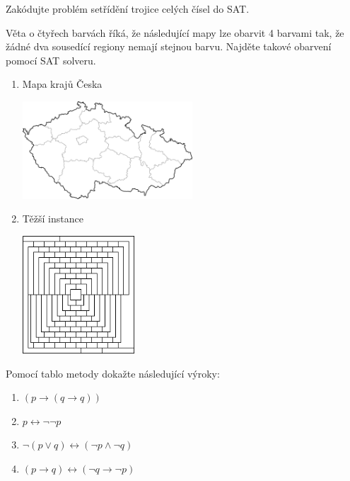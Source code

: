 \documentclass[a4paper,12pt]{article}
\begin{document}
        
    \medskip\begin{problem}
        Zakódujte problém setřídění trojice celých čísel do SAT.
    \end{problem}
        
            
    \medskip\begin{problem}
    Věta o čtyřech barvách říká, že následující mapy lze obarvit 4 barvami tak, že žádné dva sousedící regiony nemají stejnou barvu. Najděte takové obarvení pomocí SAT solveru.
    \begin{multicols}{2}
    \begin{enumerate}
        \item Mapa krajů Česka  
        
        \vfill \includegraphics[width=0.5\textwidth]{files/map-coloring-czechia.png} \vfill
        
        \item Těžší instance  
        
        \vfill \includegraphics[width=0.33\textwidth]{files/map-coloring-hard.png} \vfill
    \end{enumerate}
    \end{multicols}
    \end{problem}
    
    
\newpage   


\medskip\begin{problem}
    Pomocí tablo metody dokažte následující výroky:
    \begin{enumerate}
    \item $(p\to (q \to q))$
    \item $p \leftrightarrow \neg \neg  p$
    \item $\neg (p \vee q) \leftrightarrow (\neg p \wedge \neg q)$
    \item $(p \to q) \leftrightarrow (\neg q \to \neg p)$    
    \end{enumerate}
\end{problem} 
   
\end{document}
